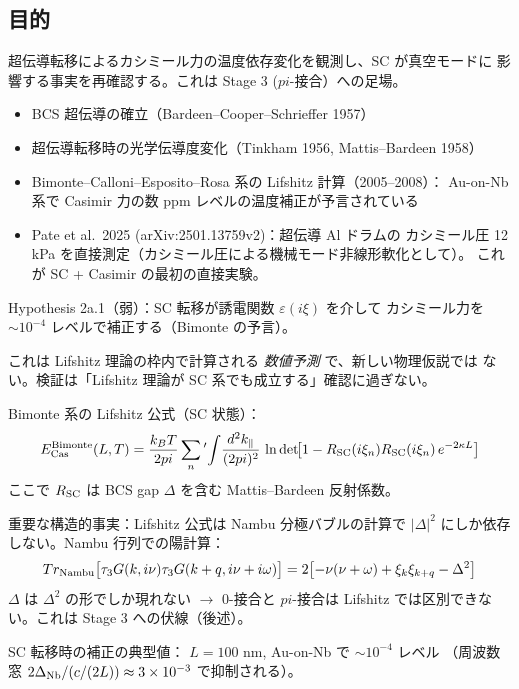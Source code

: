 \documentclass[11pt,a4paper]{article}
\def\pi{pi}%
\def\mathrm#1{#1}%
\def\textbf#1{#1}%
\begin{document}
\subsection{目的}

超伝導転移によるカシミール力の温度依存変化を観測し、\textbf{SC が真空モードに
影響する}事実を再確認する。これは Stage 3 (\;$\pi$-接合）への足場。

\begin{confirmedbox}
\begin{itemize}
\item BCS 超伝導の確立（Bardeen--Cooper--Schrieffer 1957）
\item 超伝導転移時の光学伝導度変化（Tinkham 1956, Mattis--Bardeen 1958）
\item Bimonte--Calloni--Esposito--Rosa 系の Lifshitz 計算（2005--2008）：
  Au-on-Nb 系で Casimir 力の数 ppm レベルの温度補正が予言されている
\item \textbf{Pate et al.\ 2025} (arXiv:2501.13759v2)：超伝導 Al ドラムの
  カシミール圧 12 kPa を直接測定（カシミール圧による機械モード非線形軟化として）。
  これが \textbf{SC + Casimir} の最初の直接実験。
\end{itemize}
\end{confirmedbox}

\begin{hypothesisbox}
\textbf{Hypothesis 2a.1}（弱）：SC 転移が誘電関数 $\varepsilon(i\xi)$ を介して
カシミール力を $\sim 10^{-4}$ レベルで補正する（Bimonte の予言）。

これは Lifshitz 理論の枠内で計算される \emph{数値予測} で、新しい物理仮説では
ない。検証は「Lifshitz 理論が SC 系でも成立する」確認に過ぎない。
\end{hypothesisbox}

\begin{theorybox}
\textbf{Bimonte 系の Lifshitz 公式（SC 状態）}：
\[
  E_{\rm Cas}^{\rm Bimonte}(L, T) = \frac{k_B T}{2\pi}\sum_{n}{}'\!\int\!\frac{d^2 k_\parallel}{(2\pi)^2}\,
  \ln\det\!\bigl[1 - R_{\rm SC}(i\xi_n) R_{\rm SC}(i\xi_n)\,e^{-2\kappa L}\bigr]
\]
ここで $R_{\rm SC}$ は BCS gap $\Delta$ を含む Mattis--Bardeen 反射係数。

\textbf{重要な構造的事実}：Lifshitz 公式は Nambu 分極バブルの計算で
\textbf{$|\Delta|^2$ にしか依存しない}。Nambu 行列での陽計算：
\[
  \mathrm{Tr}_{\rm Nambu}\bigl[\tau_3 G(k,i\nu) \tau_3 G(k+q, i\nu+i\omega)\bigr]
  = 2\bigl[-\nu(\nu+\omega) + \xi_k \xi_{k+q} - \Delta^2\bigr]
\]
$\Delta$ は $\Delta^2$ の形でしか現れない $\to$ \textbf{0-接合と $\pi$-接合は
Lifshitz では区別できない}。これは Stage 3 への伏線（後述）。

\textbf{SC 転移時の補正の典型値}：
$L = 100$ nm, Au-on-Nb で $\sim 10^{-4}$ レベル
（周波数窓 $2\Delta_{\rm Nb}/(c/(2L)) \approx 3\times 10^{-3}$ で抑制される）。
\end{theorybox}
\end{document}
